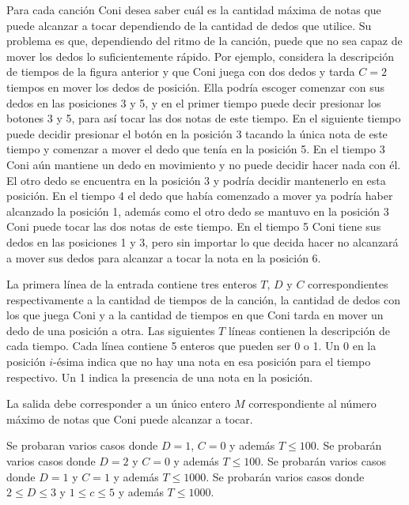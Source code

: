 \documentclass{oci}
\begin{document}
\begin{problemDescription}
  Para cada canción Coni desea saber cuál es la cantidad máxima de notas que
  puede alcanzar a tocar dependiendo de la cantidad de dedos que utilice.
  Su problema es que, dependiendo del ritmo de la canción, puede que no sea
  capaz de mover los dedos lo suficientemente rápido.
  Por ejemplo, considera la descripción de tiempos de la figura anterior y que
  Coni juega con dos dedos y tarda $C=2$ tiempos en mover los dedos de posición.
  Ella podría escoger comenzar con sus dedos en las posiciones 3 y 5, y en el
  primer tiempo puede decir presionar los botones 3 y 5, para así tocar
  las dos notas de este tiempo.
  En el siguiente tiempo puede decidir presionar el botón en la posición 3
  tacando la única nota de este tiempo y comenzar a mover el dedo que
  tenía en la posición 5.
  En el tiempo 3 Coni aún mantiene un dedo en movimiento y no puede decidir
  hacer nada con él.
  El otro dedo se encuentra en la posición 3 y podría decidir mantenerlo en esta
  posición.
  En el tiempo 4 el dedo que había comenzado a mover ya podría haber alcanzado
  la posición 1, además como el otro dedo se mantuvo en la posición 3 Coni puede
  tocar las dos notas de este tiempo.
  En el tiempo 5 Coni tiene sus dedos en las posiciones 1 y 3, pero sin importar
  lo que decida hacer no alcanzará a mover sus dedos para alcanzar a tocar la
  nota en la posición 6.
\end{problemDescription}
\begin{inputDescription}
  La primera línea de la entrada contiene tres enteros $T$, $D$ y $C$
  correspondientes respectivamente a la cantidad de tiempos de la canción, la
  cantidad de dedos con los que juega Coni y a la cantidad de tiempos en que
  Coni tarda en mover un dedo de una posición a otra.
  Las siguientes $T$ líneas contienen la descripción de cada tiempo.
  Cada línea contiene 5 enteros que pueden ser 0 o 1.
  Un 0 en la posición $i$-ésima indica que no hay una nota en esa posición para
  el tiempo respectivo.
  Un 1 indica la presencia de una nota en la posición.
\end{inputDescription}

\begin{outputDescription}
  La salida debe corresponder a un único entero $M$ correspondiente al número
  máximo de notas que Coni puede alcanzar a tocar.
\end{outputDescription}

\begin{scoreDescription}
   Se probaran varios casos donde $D = 1$, $C = 0$ y además $T \le 100$.
   Se probarán varios casos donde $D = 2$ y $C = 0$ y además $T \le 100$.
   Se probarán varios casos donde $D = 1$ y $C = 1$ y además $T \le 1000$.
   Se probarán varios casos donde $2 \le D \le 3$ y $1 \le c \le 5$ y
  además $T \le 1000$.
\end{scoreDescription}

\begin{sampleDescription}
\end{sampleDescription}
\end{document}
